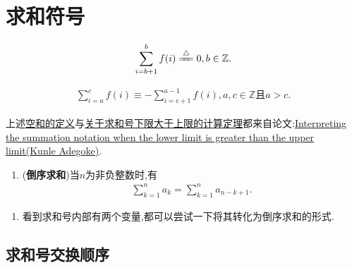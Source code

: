 \documentclass[../../main.tex]{subfiles}
\begin{document}
\section{求和符号}

\begin{definition}\label{definition:空和(Empty sum)}
\begin{align}
\sum\limits_{i=b+1}^b{f(i)}\xlongequal{\bigtriangleup}0,b\in \mathbb{Z}.
\end{align}
\end{definition}

\begin{theorem}[关于求和号下限大于上限的计算]\label{theorem:关于求和号下限大于上限的计算}
\begin{align}
\sum\limits_{i=a}^c{f(i)}\equiv -\sum\limits_{i=c+1}^{a-1}{f(i),a,c}\in \mathbb{Z}\text{且} a>c. 
\end{align}
\end{theorem}
\begin{note}
上述\hyperref[definition:空和(Empty sum)]{空和的定义}与\hyperref[theorem:关于求和号下限大于上限的计算]{关于求和号下限大于上限的计算定理}都来自论文:\href{https://vixra.org/pdf/1601.0207v1.pdf}{Interpreting the summation notation when
the lower limit is greater than the upper limit(Kunle Adegoke)}.
\end{note}

\begin{theorem}[求和号基本性质]\label{theorem:求和号基本性质}
\begin{enumerate}
\item\label{theorem:求和号基本性质1} (\textbf{倒序求和})当$n$为非负整数时,有
\begin{align*}
\sum\limits_{k=1}^n{a_k}=\sum\limits_{k=1}^n{a_{n-k+1}}.
\end{align*}
\end{enumerate}
\end{theorem}
\begin{note}
\begin{enumerate}
\item 看到求和号内部有两个变量,都可以尝试一下将其转化为倒序求和的形式.
\end{enumerate}
\end{note}


\subsection{求和号交换顺序}
\end{document}
